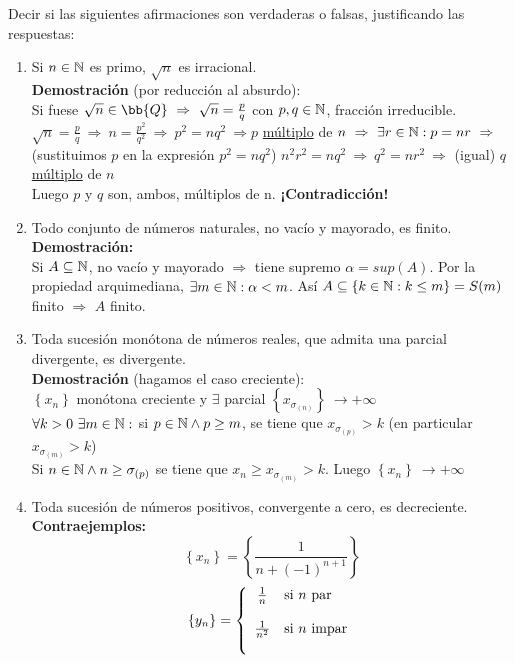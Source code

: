 \documentclass[12pt]{article}
\begin{document}
	\begin{ejercicio}[2 puntos] Decir si las siguientes afirmaciones son verdaderas o falsas, justificando las respuestas:
		\begin{enumerate}
			\item Si $n \in {\mathbb{N}}$ es primo, $\sqrt{n}$ es irracional.  \\
			\textbf{Demostración }(por reducción al absurdo): \\
			Si fuese $\sqrt{n} \in \bb{Q} \ \Rightarrow  \ \sqrt{n}= \frac{p}{q}$ con $p,q \in {\mathbb{N}}$, fracción irreducible. \\
			$ \sqrt{n}= \frac{p}{q} \ \Rightarrow \ n= \frac{p^2}{q^2} \ \Rightarrow \ p^2=nq^2 \ \Rightarrow p$ \underline{múltiplo}  de $n \ \Rightarrow \ \exists r \in {\mathbb{N}} : p=nr \ \Rightarrow $
			(sustituimos $p$ en la expresión $p^2=nq^2$) $ n^2r^2=nq^2 \ \Rightarrow \ q^2=nr^2 \ \Rightarrow$ (igual) $q$ \underline{múltiplo} de $n$ \\
			Luego $p$ y $q$ son, ambos, múltiplos de n. \textbf{¡Contradicción!}
				
			\item Todo conjunto de números naturales, no vacío y mayorado, es finito.  \\
			\textbf{Demostración:}\\
			Si $A \subseteq {\mathbb{N}}$, no vacío y mayorado $\Rightarrow$ tiene supremo $\alpha= sup(A)$. Por la propiedad arquimediana, $\exists m \in {\mathbb{N}} : \alpha < m$. Así $A \subseteq \left\{k \in {\mathbb{N}} : k \leq m\right\}=S(m)$ finito $\Rightarrow$ $A$ finito.
			
			\item Toda sucesión monótona de números reales, que admita una parcial divergente, es divergente.  \\
			\textbf{Demostración }(hagamos el caso creciente): \\
			$\left\{x_n\right\}$ monótona creciente y $\exists$ parcial $\left\{x_{\sigma_{(n)}}\right\} \ \to +\infty$ \\
			$\forall k>0 \ \exists m \in {\mathbb{N}} : $ si $ p \in {\mathbb{N}} \land p \geq m$, se tiene que  $x_{\sigma_{(p)}} > k$ (en particular $x_{\sigma_{(m)}} > k$)\\
			Si $n \in {\mathbb{N}} \land n \geq \sigma_{(p)}$ se tiene que $x_n \geq x_{\sigma_{(m)}} > k$. Luego  $\left\{x_n\right\} \ \to +\infty$
			\item Toda sucesión de números positivos, convergente a cero, es decreciente.  \\
			\textbf{Contraejemplos:}\\
			$$\left\{x_n\right\} = \left\{\frac{1}{n + (-1)^{n+1}}\right\}$$
			\[
			\left\{y_n\right\}=
			\left \{
			\begin{array}{c l}
				\frac{1}{n} & \text{si $n$ par} \\ \\
				\frac{1}{n^2} & \text{si $n$ impar} \\ \\
			\end{array}
			\right .
			\]
		\end{enumerate}
	\end{ejercicio}
	
\end{document}
